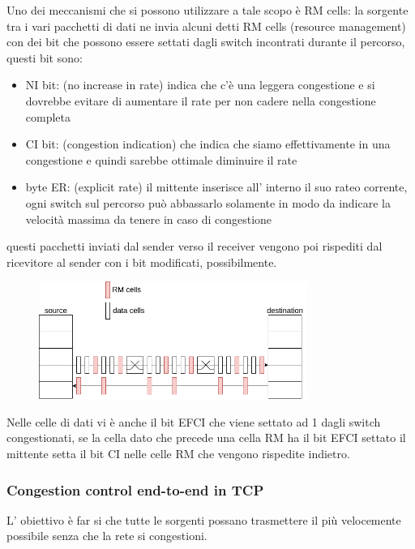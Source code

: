 Uno dei meccanismi che si possono utilizzare a tale scopo è RM cells: la sorgente tra i vari pacchetti di dati ne invia alcuni detti RM cells (resource management) con dei bit che possono essere settati dagli switch incontrati durante il percorso, questi bit sono:
\begin{itemize}
    \item NI bit: (no increase in rate) indica che c'è una leggera congestione e si dovrebbe evitare di aumentare il rate per non cadere nella congestione completa

    \item CI bit: (congestion indication) che indica che siamo effettivamente in una congestione e quindi sarebbe ottimale diminuire il rate
    
    \item byte ER: (explicit rate) il mittente inserisce all' interno il suo rateo corrente, ogni switch sul percorso può abbassarlo solamente in modo da indicare la velocità massima da tenere in caso di congestione
\end{itemize}
questi pacchetti inviati dal sender verso il receiver vengono poi rispediti dal ricevitore al sender con i bit modificati, possibilmente.
\begin{figure}[H]
    \centering
    \includegraphics[width=330px]{images/6_Trasporto/ATM_ABR_congestion_control.png}
\end{figure}
Nelle celle di dati vi è anche il bit EFCI che viene settato ad 1 dagli switch congestionati, se la cella dato che precede una cella RM ha il bit EFCI settato il mittente setta il bit CI nelle celle RM che vengono rispedite indietro.


\subsubsection{Congestion control end-to-end in TCP}
L' obiettivo è far si che tutte le sorgenti possano trasmettere il più velocemente possibile senza che la rete si congestioni.

